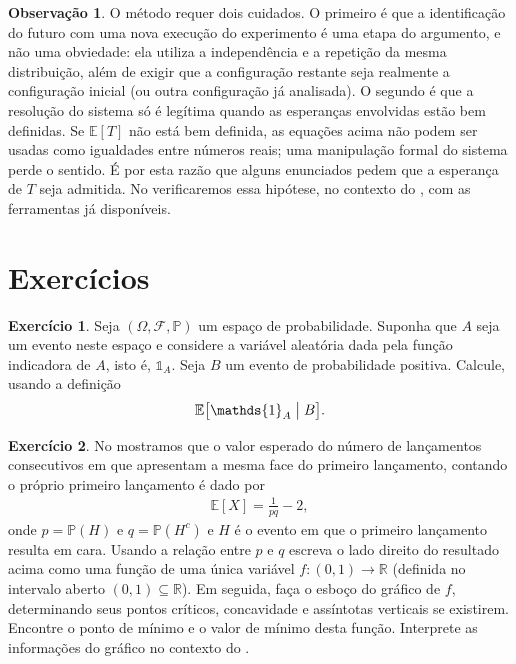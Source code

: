 \documentclass[12pt,portuguese]{article}
\theoremstyle{definition}
\newtheorem{remark}[remark]{Observação}
\newtheorem{exercise}{Exercício}
\begin{document}
\begin{remark}
O método requer dois cuidados. O primeiro é que a identificação do futuro
com uma nova execução do experimento é uma etapa do argumento, e não uma
obviedade: ela utiliza a independência e a repetição da mesma distribuição,
além de exigir que a configuração restante seja realmente a configuração
inicial (ou outra configuração já analisada). O segundo é que a resolução do
sistema só é legítima quando as esperanças envolvidas estão bem definidas.
Se \(\mathbb{E}[T]\) não está bem definida, as equações acima não podem ser
usadas como igualdades entre números reais; uma manipulação formal do sistema
perde o sentido. É por esta razão que alguns enunciados pedem que a esperança
de \(T\) seja admitida. No
 verificaremos essa hipótese, no
contexto do , com as ferramentas já
disponíveis.
\end{remark}

\section{Exercícios}
\label{sec:exercicios}


\begin{exercise}\label{exercise:indicadora}
Seja $(\Omega,\mathcal{F},\mathbb{P})$ um espaço de probabilidade. Suponha que $A$ seja um evento
neste espaço e considere a variável aleatória dada pela função indicadora de $A$, isto é,
$\mathds{1}_{A}$. Seja $B$ um evento de probabilidade positiva. Calcule, usando a definição 
\begin{align*}
\mathbb{E}\bigl[ \mathds{1}_{A} \bigm| B\bigr].
\end{align*}
\end{exercise}


\begin{exercise}
No  mostramos que o valor esperado do número de lançamentos
consecutivos em que apresentam a mesma face do primeiro lançamento, contando o próprio
primeiro lançamento é dado por 
\begin{align*}
\mathbb{E}[X] = \frac{1}{pq}-2,
\end{align*} 
onde $p=\mathbb{P}(H)$ e $q=\mathbb{P}(H^c)$ e $H$ é o evento em que o primeiro lançamento 
resulta em cara. Usando a relação entre $p$ e $q$ escreva o lado direito
do resultado acima como uma função de uma única variável
$f:(0,1)\to\mathbb{R}$ (definida no intervalo aberto $(0,1)\subseteq \mathbb{R}$). 
Em seguida, faça o esboço do gráfico de $f$, determinando
seus pontos críticos, concavidade e assíntotas verticais se existirem. Encontre
o ponto de mínimo e o valor de mínimo desta função. Interprete as informações
do gráfico no contexto do .
\end{exercise}
\end{document}
